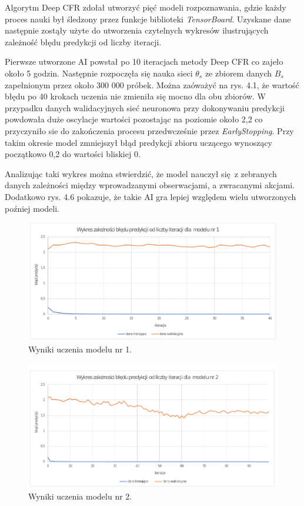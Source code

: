 \documentclass[12pt,oneside,a4paper]{report}
\begin{document}
Algorytm Deep CFR zdołał utworzyć pięć modeli rozpoznawania, gdzie każdy proces nauki
był
śledzony przez funkcje biblioteki \emph{TensorBoard}. Uzyskane dane następnie zostąły
użyte do utworzenia czytelnych wykresów ilustrujących zależność błędu predykcji od liczby
iteracji.

Pierwsze utworzone AI powstał po 10 iteracjach metody Deep CFR co zajeło około 5 godzin.
Następnie rozpoczęła się nauka sieci $\theta_{s}$ ze zbiorem danych $B_{s}$ zapełnionym przez około 300 000 próbek.
Można zaóważyć na rys. 4.1,
że wartość błędu po 40 krokach uczenia nie zmieniła się mocno dla obu zbiorów.
W przypadku danych walidacyjnych sieć neuronowa przy dokonywaniu predykcji powdowała duże oscylacje
wartości pozostając na poziomie około 2,2 co przyczyniło sie do zakończenia procesu przedwcześnie przez \emph{EarlyStopping}.
Przy takim okresie model zmniejszył błąd predykcji zbioru uczącego wynoszący początkowo 0,2 do wartości bliskiej 0.

Analizując taki wykres można stwierdzić, że model nauczył się z zebranych danych zależności między
wprowadzanymi obserwacjami, a zwracanymi akcjami. Dodatkowo rys. 4.6 pokazuje, że takie AI gra lepiej
względem wielu utworzonych poźniej modeli.


\begin{figure}[!ht]
  \centering
  \includegraphics[width=1\textwidth]{./img/model1.pdf}
\caption{Wyniki uczenia modelu nr 1.}
\end{figure}


\begin{figure}[!ht]
  \centering
  \includegraphics[width=1\textwidth]{./img/model2.pdf}
\caption{Wyniki uczenia modelu nr 2.}
\end{figure}
\end{document}

